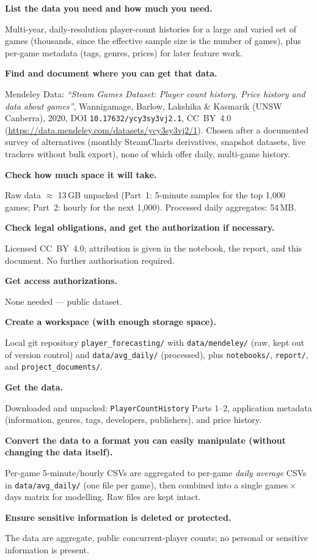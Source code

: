 \documentclass[11pt,a4paper]{article}
\newcommand{\chk}[1]{\item \textbf{#1}\par\nopagebreak\vspace{0.15em}}
\begin{document}
\begin{checklist}

\chk{List the data you need and how much you need.}
Multi-year, daily-resolution player-count histories for a large and varied
set of games (thousands, since the effective sample size is the number of
games), plus per-game metadata (tags, genres, prices) for later feature
work.

\chk{Find and document where you can get that data.}
Mendeley Data: \emph{``Steam Games Dataset: Player count history, Price
history and data about games''}, Wannigamage, Barlow, Lakshika \& Kasmarik
(UNSW Canberra), 2020, DOI \texttt{10.17632/ycy3sy3vj2.1}, CC~BY~4.0
(\url{https://data.mendeley.com/datasets/ycy3sy3vj2/1}). Chosen after a
documented survey of alternatives (monthly SteamCharts derivatives, snapshot
datasets, live trackers without bulk export), none of which offer daily,
multi-game history.

\chk{Check how much space it will take.}
Raw data $\approx$ 13\,GB unpacked (Part~1: 5-minute samples for the top
1{,}000 games; Part~2: hourly for the next 1{,}000). Processed daily
aggregates: 54\,MB.

\chk{Check legal obligations, and get the authorization if necessary.}
Licensed CC~BY~4.0; attribution is given in the notebook, the report, and
this document. No further authorisation required.

\chk{Get access authorizations.}
None needed --- public dataset.

\chk{Create a workspace (with enough storage space).}
Local git repository \texttt{player\_forecasting/} with
\texttt{data/mendeley/} (raw, kept out of version control) and
\texttt{data/avg\_daily/} (processed), plus \texttt{notebooks/},
\texttt{report/}, and \texttt{project\_documents/}.

\chk{Get the data.}
Downloaded and unpacked: \texttt{PlayerCountHistory} Parts 1--2,
application metadata (information, genres, tags, developers, publishers),
and price history.

\chk{Convert the data to a format you can easily manipulate (without changing the data itself).}
Per-game 5-minute/hourly CSVs are aggregated to per-game \emph{daily
average} CSVs in \texttt{data/avg\_daily/} (one file per game), then
combined into a single games\,$\times$\,days matrix for modelling. Raw
files are kept intact.

\chk{Ensure sensitive information is deleted or protected.}
The data are aggregate, public concurrent-player counts; no personal or
sensitive information is present.


\end{checklist}
\end{document}
